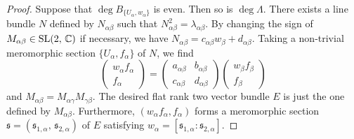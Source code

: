\documentclass[12pt]{article}
\begin{document}
\begin{proof}
Suppose that $\deg B_{\{U_{\alpha}, w_{\alpha}\}}$ is even. Then so is $\deg \Lambda$. There exists a line bundle $N$ defined by $N_{\alpha\beta}$ such that $N_{\alpha\beta}^2 = \lambda_{\alpha\beta}$. By changing the sign of $M_{\alpha\beta}\in {\rm SL(2,\,{\mathbb C})}$ if necessary,  we have $N_{\alpha\beta} = c_{\alpha\beta}w_{\beta} + d_{\alpha\beta}$. Taking a non-trivial  meromorphic section $\{U_{\alpha}, f_{\alpha}\}$ of $N$, we find
\[ \begin{pmatrix}
  w_{\alpha}f_{\alpha} \\
  f_{\alpha}
\end{pmatrix} = \begin{pmatrix}
  a_{\alpha\beta} & b_{\alpha\beta} \\
  c_{\alpha\beta} & d_{\alpha\beta}
\end{pmatrix} \begin{pmatrix}
  w_{\beta}f_{\beta} \\
  f_{\beta}
\end{pmatrix} \]
and $M_{\alpha\beta} = M_{\alpha\gamma} M_{\gamma\beta}$. The desired flat rank two vector bundle $E$ is just the one defined by $M_{\alpha\beta}$. Furthermore,  $(w_{\alpha}f_{\alpha}, f_{\alpha})$ forms a meromorphic section ${\mathfrak s}=({\mathfrak s}_{1,\alpha},\,{\mathfrak s}_{2,\alpha})$ of $E$ satisfying $w_\alpha=[{\mathfrak s}_{1,\alpha} : {\mathfrak s}_{2,\alpha}]$.


\end{proof}
\end{document}
